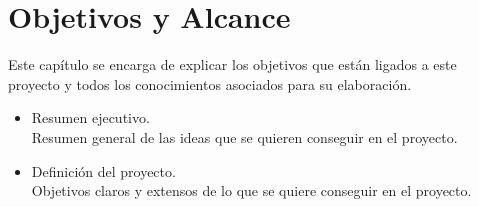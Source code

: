 \chapter{Objetivos y Alcance}\label{oya}

\thispagestyle{fancy}


Este capítulo se encarga de explicar los objetivos que están ligados a este proyecto y todos los conocimientos asociados para su elaboración.

\begin{itemize}
    \item Resumen ejecutivo.\\Resumen general de las ideas que se quieren conseguir en el proyecto.
    \item Definición del proyecto.\\Objetivos claros y extensos de lo que se quiere conseguir en el proyecto.
\end{itemize}

